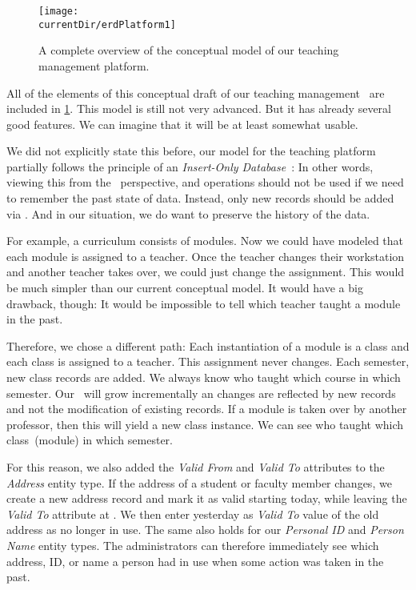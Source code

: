 \begin{figure}%
\centering%
\texttt{[image: \\currentDir/erdPlatform1]}%
\caption{A complete overview of the conceptual model of our teaching management platform.}%
\label{fig:erdPlatform1}%
\end{figure}%
%
All of the elements of this conceptual draft of our teaching management \db\ are included in \cref{fig:erdPlatform1}.
This model is still not very advanced.
But it has already several good features.
We can imagine that it will be at least somewhat usable.

We did not explicitly state this before, our model for the teaching platform partially follows the principle of an \emph{Insert-Only Database}~\cite{P2014ACIIMDMTIMOIMD:IO}:%
%
%
%
In other words, viewing this from the \sql\ perspective,  and  operations should not be used if we need to remember the past state of data.
Instead, only new records should be added via .
And in our situation, we do want to preserve the history of the data.

For example, a curriculum consists of modules.
Now we could have modeled that each module is assigned to a teacher.
Once the teacher changes their workstation and another teacher takes over, we could just change the assignment.
This would be much simpler than our current conceptual model.
It would have a big drawback, though:
It would be impossible to tell which teacher taught a module in the past.

Therefore, we chose a different path:
Each instantiation of a module is a class and each class is assigned to a teacher.
This assignment never changes.
Each semester, new class records are added.
We always know who taught which course in which semester.
Our \db\ will grow incrementally an changes are reflected by new records and not the modification of existing records.
If a module is taken over by another professor, then this will yield a new class instance.
We can see who taught which class~(module) in which semester.

For this reason, we also added the \emph{Valid From} and \emph{Valid To} attributes to the \emph{Address} entity type.
If the address of a student or faculty member changes, we create a new address record and mark it as valid starting today, while leaving the \emph{Valid To} attribute at .
We then enter yesterday as \emph{Valid To} value of the old address as no longer in use.
The same also holds for our \emph{Personal ID} and \emph{Person Name} entity types.
The administrators can therefore immediately see which address, ID, or name a person had in use when some action was taken in the past.

